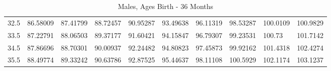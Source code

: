 \documentclass[10pt,twocolumn,letterpaper]{article}
\begin{document}
\begin{table}
{\begin{tabular}{llllllllll}
    32.5            & 86.58009                               & 87.41799                               & 88.72457                                & 90.95287                                & 93.49638                                & 96.11319                                & 98.53287                                & 100.0109                                & 100.9829                                \\
    33.5            & 87.22791                               & 88.06503                               & 89.37177                                & 91.60421                                & 94.15847                                & 96.79307                                & 99.23531                                & 100.73                                  & 101.7142                                \\
    34.5            & 87.86696                               & 88.70301                               & 90.00937                                & 92.24482                                & 94.80823                                & 97.45873                                & 99.92162                                & 101.4318                                & 102.4274                                \\
    35.5            & 88.49774                               & 89.33242                               & 90.63786                                & 92.87525                                & 95.44637                                & 98.11108                                & 100.5929                                & 102.1174                                & 103.1237                                \\
    \end{tabular}
		}
    \caption {Males, Ages Birth - $36$ Months}
		
\end{table}
\end{document}
